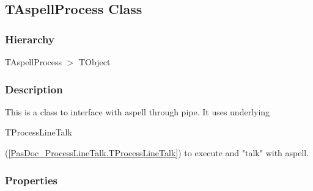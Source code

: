 \documentclass{report}
\begin{document}
\subsection*{TAspellProcess Class}
\fi
\label{PasDoc_Aspell.TAspellProcess}
\subsubsection*{\large{\textbf{Hierarchy}}\normalsize\hspace{1ex}\hfill}
TAspellProcess {$>$} TObject
\subsubsection*{\large{\textbf{Description}}\normalsize\hspace{1ex}\hfill}
This is a class to interface with aspell through pipe. It uses underlying \begin{ttfamily}TProcessLineTalk\end{ttfamily}(\ref{PasDoc_ProcessLineTalk.TProcessLineTalk}) to execute and "talk" with aspell.\subsubsection*{\large{\textbf{Properties}}\normalsize\hspace{1ex}\hfill}
\end{document}
